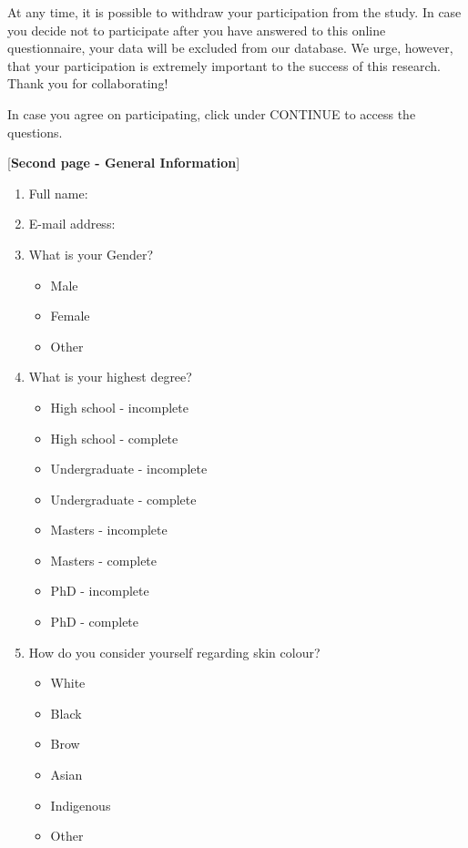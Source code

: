 \documentclass[a4paper, 12pt, openright, oneside, german, french, brazil, english]{abntex2}
\begin{document}
        At any time, it is possible to withdraw your participation from the study. In case you decide not to participate after you have answered to this online questionnaire, your data will be excluded from our database. We urge, however, that your participation is extremely important to the success of this research. Thank you for collaborating!

        In case you agree on participating, click under CONTINUE to access the questions.

        [\textbf{Second page - General Information}] %

        \begin{enumerate}
        \item Full name: 
        \item E-mail address:

        \item What is your Gender?
          \begin{itemize}
          \item Male
          \item Female
          \item Other
          \end{itemize}

        \item What is your highest degree?
          \begin{itemize}
          \item High school - incomplete
          \item High school - complete
          \item Undergraduate - incomplete
          \item Undergraduate - complete
          \item Masters - incomplete
          \item Masters - complete
          \item PhD - incomplete
          \item PhD - complete
          \end{itemize}

        \item How do you consider yourself regarding skin colour?
          \begin{itemize}
          \item White
          \item Black
          \item Brow
          \item Asian
          \item Indigenous
          \item Other
          \end{itemize}


\end{enumerate}
\end{document}
